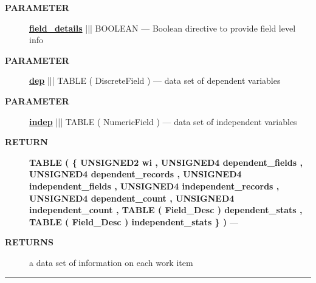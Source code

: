 \par
\begin{description}
\item [\colorbox{tagtype}{\color{white} \textbf{\textsf{PARAMETER}}}] \textbf{\underline{field\_details}} ||| BOOLEAN --- Boolean directive to provide field level info
\item [\colorbox{tagtype}{\color{white} \textbf{\textsf{PARAMETER}}}] \textbf{\underline{dep}} ||| TABLE ( DiscreteField ) --- data set of dependent variables
\item [\colorbox{tagtype}{\color{white} \textbf{\textsf{PARAMETER}}}] \textbf{\underline{indep}} ||| TABLE ( NumericField ) --- data set of independent variables
\end{description}







\par
\begin{description}
\item [\colorbox{tagtype}{\color{white} \textbf{\textsf{RETURN}}}] \textbf{TABLE ( \{ UNSIGNED2 wi , UNSIGNED4 dependent\_fields , UNSIGNED4 dependent\_records , UNSIGNED4 independent\_fields , UNSIGNED4 independent\_records , UNSIGNED4 dependent\_count , UNSIGNED4 independent\_count , TABLE ( Field\_Desc ) dependent\_stats , TABLE ( Field\_Desc ) independent\_stats \} )} --- 
\end{description}






\par
\begin{description}
\item [\colorbox{tagtype}{\color{white} \textbf{\textsf{RETURNS}}}] a data set of information on each work item
\end{description}




\rule{\linewidth}{0.5pt}
